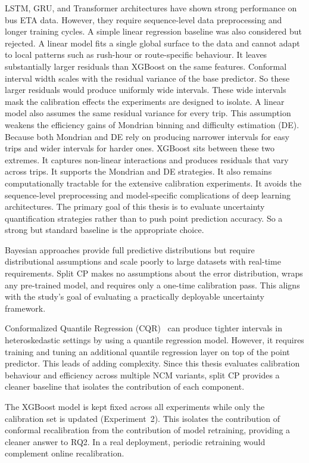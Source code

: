 \documentclass[12pt, a4paper, oneside]{report}
\begin{document}
LSTM, GRU, and Transformer architectures have shown strong performance on bus ETA data. However, they require sequence-level data preprocessing and longer training cycles. A simple linear regression baseline was also considered but rejected. A linear model fits a single global surface to the data and cannot adapt to local patterns such as rush-hour or route-specific behaviour. It leaves substantially larger residuals than XGBoost on the same features. Conformal interval width scales with the residual variance of the base predictor. So these larger residuals would produce uniformly wide intervals. These wide intervals mask the calibration effects the experiments are designed to isolate. A linear model also assumes the same residual variance for every trip. This assumption weakens the efficiency gains of Mondrian binning and difficulty estimation (DE). Because both Mondrian and DE rely on producing narrower intervals for easy trips and wider intervals for harder ones. XGBoost sits between these two extremes. It captures non-linear interactions and produces residuals that vary across trips. It supports the Mondrian and DE strategies. It also remains computationally tractable for the extensive calibration experiments. It avoids the sequence-level preprocessing and model-specific complications of deep learning architectures. The primary goal of this thesis is to evaluate uncertainty quantification strategies rather than to push point prediction accuracy. So a strong but standard baseline is the appropriate choice.

Bayesian approaches provide full predictive distributions but require distributional assumptions and scale poorly to large datasets with real-time requirements. Split CP makes no assumptions about the error distribution, wraps any pre-trained model, and requires only a one-time calibration pass. This aligns with the study's goal of evaluating a practically deployable uncertainty framework.

Conformalized Quantile Regression (CQR)~\cite{Romano2019} can produce tighter intervals in heteroskedastic settings by using a quantile regression model. However, it requires training and tuning an additional quantile regression layer on top of the point predictor. This leads of adding complexity. Since this thesis evaluates calibration behaviour and efficiency across multiple NCM variants, split CP provides a cleaner baseline that isolates the contribution of each component.

The XGBoost model is kept fixed across all experiments while only the calibration set is updated (Experiment~2). This isolates the contribution of conformal recalibration from the contribution of model retraining, providing a cleaner answer to RQ2. In a real deployment, periodic retraining would complement online recalibration.
\end{document}
